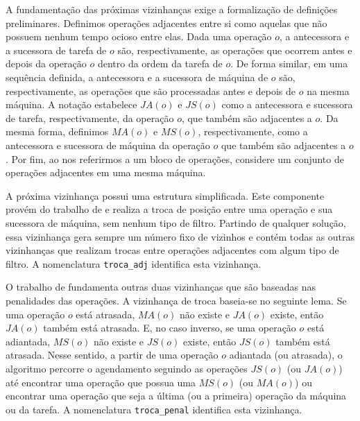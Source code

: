 A fundamentação das próximas vizinhanças exige a formalização de definições preliminares. Definimos operações adjacentes entre si como aquelas que não possuem nenhum tempo ocioso entre elas. Dada uma operação $o$, a antecessora e a sucessora de tarefa de $o$ são, respectivamente, as operações que ocorrem antes e depois da operação $o$ dentro da ordem da tarefa de $o$. De forma similar, em uma sequência definida, a antecessora e a sucessora de máquina de $o$ são, respectivamente, as operações que são processadas antes e depois de $o$ na mesma máquina. A notação estabelece $JA(o)$ e $JS(o)$ como a antecessora e sucessora de tarefa, respectivamente, da operação $o$, que também são adjacentes a $o$. Da mesma forma, definimos $MA(o)$ e $MS(o)$, respectivamente, como a antecessora e sucessora de máquina da operação $o$ que também são adjacentes a $o$. Por fim, ao nos referirmos a um bloco de operações, considere um conjunto de operações adjacentes em uma mesma máquina.

A próxima vizinhança possui uma estrutura simplificada. Este componente provém do trabalho de \cite{dos2010combination} e realiza a troca de posição entre uma operação e sua sucessora de máquina, sem nenhum tipo de filtro. Partindo de qualquer solução, essa vizinhança gera sempre um número fixo de vizinhos e contém todas as outras vizinhanças que realizam trocas entre operações adjacentes com algum tipo de filtro. A nomenclatura \texttt{troca\_adj} identifica esta vizinhança.

O trabalho de \cite{wang2014variable} fundamenta outras duas vizinhanças que são baseadas nas penalidades das operações. A vizinhança de troca baseia-se no seguinte lema. Se uma operação $o$ está atrasada, $MA(o)$ não existe e $JA(o)$ existe, então $JA(o)$ também está atrasada. E, no caso inverso, se uma operação $o$ está adiantada, $MS(o)$ não existe e $JS(o)$ existe, então $JS(o)$ também está atrasada. Nesse sentido, a partir de uma operação $o$ adiantada (ou atrasada), o algoritmo percorre o agendamento seguindo as operações $JS(o)$ (ou $JA(o)$) até encontrar uma operação que possua uma $MS(o)$ (ou $MA(o)$) ou encontrar uma operação que seja a última (ou a primeira) operação da máquina ou da tarefa. A nomenclatura \texttt{troca\_penal} identifica esta vizinhança.

